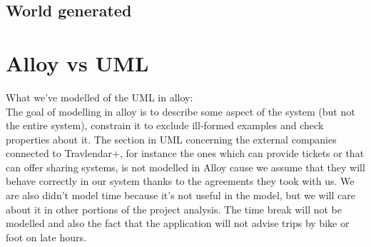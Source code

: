 %
\begin{landscape}
\section{World generated}
\begin{center}
\thispagestyle{empty}
\end{center}
\end{landscape}
%
\section{Alloy vs UML}
What we’ve modelled of the UML in alloy: \\
The goal of modelling in alloy is to describe some aspect of the system (but not the entire system), constrain it to exclude ill-formed examples and check properties about it.
The section in UML concerning the external companies connected to Travlendar+, for instance the ones which can provide tickets or that can offer sharing systems, is not modelled in Alloy cause we assume that they will behave correctly in our system thanks to the agreements they took with us.
We are also didn’t model time because it’s not useful in the model, but we will care about it in other portions of the project analysis. The time break will not be modelled and also the fact that the application will not advise trips by bike or foot on late hours.
%

